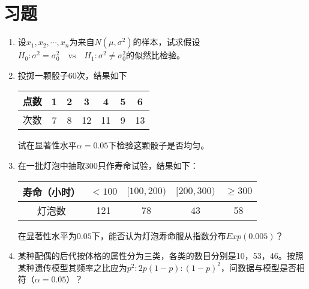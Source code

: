\section{习题}
\begin{enumerate}
    \item 设$x_1,x_2,\cdots,x_n$为来自$N(\mu,\sigma^2)$的样本，试求假设$H_0: \sigma^2 = \sigma^2_0\quad \text{vs}\quad H_1: \sigma^2 \neq \sigma_0^2$的似然比检验。
    \item 投掷一颗骰子60次，结果如下
    \begin{table}[ht]
        \centering
        \begin{tabular}{c cccccc}
             \hline
             点数 & 1 & 2 & 3 & 4 & 5 & 6 \\
             \hline
             次数 & 7 & 8 & 12 & 11 & 9 & 13 \\ 
             \hline
        \end{tabular}
    \end{table}

    试在显著性水平$\alpha = 0.05$下检验这颗骰子是否均匀。
    \item 在一批灯泡中抽取300只作寿命试验，结果如下：

    \begin{table}[ht]
        \centering
        \begin{tabular}{c cccc}
             \hline
             寿命（小时） & $<100$ & $[100,200)$ & $[200,300)$ & $\geq 300$ \\
             \hline
             灯泡数 & 121 & 78 & 43 & 58\\ 
             \hline
        \end{tabular}
    \end{table}

    在显著性水平为$0.05$下，能否认为灯泡寿命服从指数分布$Exp(0.005)$？

    \item 某种配偶的后代按体格的属性分为三类，各类的数目分别是10，53，46。按照某种遗传模型其频率之比应为$p^2:2p(1-p):(1-p)^2$，问数据与模型是否相符（$\alpha=0.05$）？
\end{enumerate}